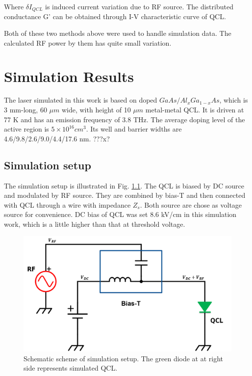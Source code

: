 \documentclass[11pt,final]{scrbook}
\begin{document}
Where $\delta { I }_{ QCL }$ is induced current variation due to RF source. The distributed conductance G' can be obtained through I-V characteristic curve of QCL.

Both of these two methods above were used to handle simulation data. The calculated RF power by them has quite small variation.

\chapter{Simulation Results}
The laser simulated in this work is based on doped $GaAs/Al_{x}Ga_{1-x}As$, which is 3 mm-long, 60 $\mu m$ wide, with height of 10 $\mu m$ metal-metal QCL. It is driven at 77 K and has an emission frequency of 3.8 THz. The average doping level of the active region is $5\times 10^{16} cm^{3}$. Its well and barrier widths are 4.6/9.8/2.6/9.0/4.4/17.6 nm. ???x?

\section{Simulation setup}
The simulation setup is illustrated in Fig. \ref{fig:schematicSETUP}. The QCL is biased by DC source and modulated by RF source. They are combined by bias-T and then connected with QCL through a wire with impedance $Z_{s}$. Both source are chose as voltage source for convenience. DC bias of QCL was set 8.6 kV/cm in this simulation work, which is a little higher than that at threshold voltage. 
\begin{figure}[htbp]
\begin{center}
\includegraphics[scale=0.4]{images/schematicSETUP}
\caption{Schematic scheme of simulation setup. The green diode at at right side represents simulated QCL.}
\label{fig:schematicSETUP}
\end{center}
\end{figure}
\end{document}

